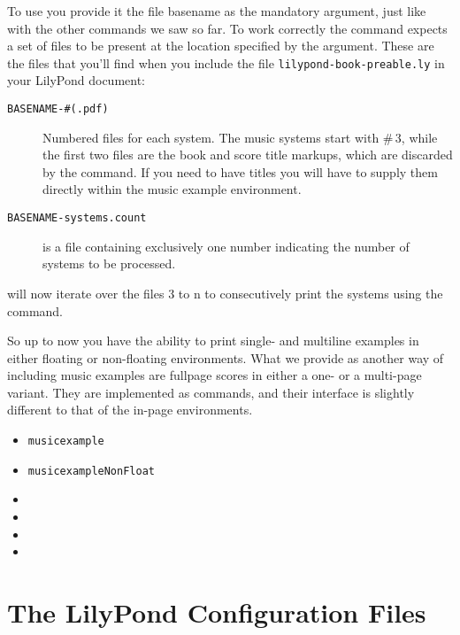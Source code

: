 \documentclass{OLLbook}
\begin{document}
To use  you provide it the file basename as the mandatory argument, just like with the other commands we saw so far.
To work correctly the command expects a set of files to be present at the location specified by the argument.
These are the files that you'll find when you include the file \texttt{lilypond-book-preable.ly} in your LilyPond document:
\begin{description}
\item[\texttt{BASENAME-\#(.pdf)}] Numbered files for each system.
The music systems start with \#\,3, while the first two files are the book and score title markups, which are discarded by the command.
If you need to have titles you will have to supply them directly within the music example environment.
\item[\texttt{BASENAME-systems.count}] is a file containing exclusively one number indicating the number of systems to be processed.
\end{description}

 will now iterate over the files 3 to n to consecutively print the systems using the  command.


\bigskip
So up to now you have the ability to print single- and multiline examples in either floating or non-floating environments.
What we provide as another way of including music examples are fullpage scores in either a one- or a multi-page variant.
They are implemented as commands, and their interface is slightly different to that of the in-page environments.

\begin{itemize}
\item \texttt{musicexample}
\item \texttt{musicexampleNonFloat}
\item {}
\item {}
\item {}
\item {}
\end{itemize}

\section{The LilyPond Configuration Files}
\label{sec:lilypond-configuration}
\end{document}
